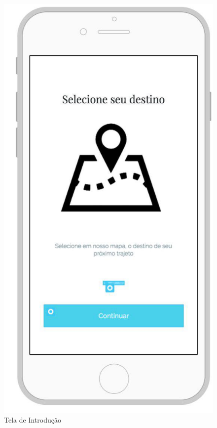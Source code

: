 \begin{figure}[!htb]
	\centering
	\includegraphics[scale=0.50]{tela_introducao.jpg}
	\caption{Tela de Introdução}
	\label{img:telaintroducao}
\end{figure}

